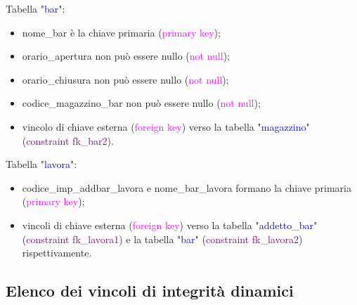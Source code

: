 \documentclass{article}
\begin{document}
    \begin{flushleft}
        Tabella "\textcolor{blue}{bar}": \\
        \begin{itemize}
            \item nome\_bar è la chiave primaria (\textcolor{magenta}{primary key}); \\
            \item orario\_apertura non può essere nullo (\textcolor{magenta}{not null}); \\
            \item orario\_chiusura non può essere nullo (\textcolor{magenta}{not null}); \\
            \item codice\_magazzino\_bar non può essere nullo (\textcolor{magenta}{not null}); \\
            \item vincolo di chiave esterna (\textcolor{magenta}{foreign key}) verso la tabella "\textcolor{blue}{magazzino}" (\textcolor{purple}{constraint fk\_bar2}). \\
        \end{itemize}        
    \end{flushleft}

    \begin{flushleft}
        Tabella "\textcolor{blue}{lavora}": \\
        \begin{itemize}
            \item codice\_imp\_addbar\_lavora e nome\_bar\_lavora formano la chiave primaria (\textcolor{magenta}{primary key}); \\
            \item vincoli di chiave esterna (\textcolor{magenta}{foreign key}) verso la tabella "\textcolor{blue}{addetto\_bar}" (\textcolor{purple}{constraint fk\_lavora1}) e la tabella "\textcolor{blue}{bar}" (\textcolor{purple}{constraint fk\_lavora2}) rispettivamente.
        \end{itemize}        
    \end{flushleft}
    
\subsection{Elenco dei vincoli di integrità dinamici}
\end{document}
